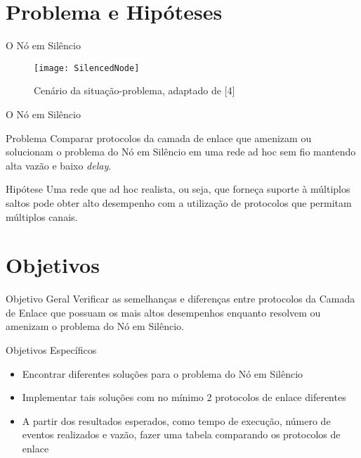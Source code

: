 \section{Problema e Hipóteses}

\begin{frame}{O Nó em Silêncio}
 
 \begin{figure}
      \texttt{[image: SilencedNode]}
      \caption{Cenário da situação-problema, adaptado de [4]}
      \label{fig:SilencedNode}
    \end{figure}
\end{frame}

\begin{frame}{O Nó em Silêncio}
  \begin{redblock}{Problema}
   Comparar protocolos da camada de enlace que amenizam ou solucionam o problema do Nó em Silêncio em uma rede ad hoc sem fio 
   mantendo alta vazão e baixo \textit{delay}.
  \end{redblock}
  \begin{block}{Hipótese}
   Uma rede que ad hoc realista, ou seja, que forneça suporte à múltiplos saltos pode obter alto desempenho com a
   utilização de protocolos que permitam múltiplos canais.
  \end{block}
\end{frame}



\section{Objetivos}

\begin{frame}{}

  \begin{block}{Objetivo Geral}
  Verificar as semelhanças e diferenças entre protocolos da Camada de Enlace que possuam os mais altos 
  desempenhos enquanto resolvem ou amenizam o problema do Nó em Silêncio.
  \end{block}
  \begin{block}{Objetivos Específicos}
    \begin{itemize}
    \item Encontrar diferentes soluções para o problema do Nó em Silêncio
    \item Implementar tais soluções com no mínimo 2 protocolos de enlace diferentes
    \item A partir dos resultados esperados, como tempo de execução, número de eventos realizados e vazão, fazer uma tabela comparando os protocolos de enlace
    \end{itemize}
  \end{block}
\end{frame}

